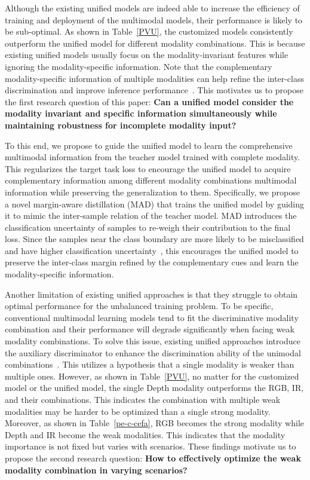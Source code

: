 \documentclass[10pt,twocolumn,letterpaper]{article}
\begin{document}
Although the existing unified models are indeed able to increase the efficiency of training and deployment of the multimodal models, their performance is likely to be sub-optimal. As shown in Table~\ref{PVU}, the customized models consistently outperform the unified model for different modality combinations. This is because existing unified models usually focus on the modality-invariant features while ignoring the modality-specific information. Note that the complementary modality-specific information of multiple modalities can help refine the inter-class discrimination and improve inference performance~\cite{ubm1,ubm2,multimodal-survey}. This motivates us to propose the first research question of this paper: \textbf{Can a unified model consider the modality invariant and specific information simultaneously while maintaining robustness for incomplete modality input? }



To this end, we propose to guide the unified model to learn the comprehensive multimodal information from the teacher model trained with complete modality. This regularizes the target task loss to encourage the unified model to acquire complementary information among different modality combinations multimodal information while preserving the generalization to them. Specifically, we propose a novel margin-aware distillation (MAD) that trains the unified model by guiding it to mimic the inter-sample relation of the teacher model. MAD introduces the classification uncertainty of samples to re-weigh their contribution to the final loss. Since the samples near the class boundary are more likely to be misclassified and have higher classification uncertainty~\cite{margin1}, this encourages the unified model to preserve the inter-class margin refined by the complementary cues and learn the modality-specific information.




Another limitation of existing unified approaches is that they struggle to obtain optimal performance for the unbalanced training problem. To be specific, conventional multimodal learning models tend to fit the discriminative modality combination and their performance will degrade significantly when facing weak modality combinations. To solve this issue, existing unified approaches introduce the auxiliary discriminator to enhance the discrimination ability of the unimodal combinations~\cite{rfnet,mmformer,robust}. This utilizes a hypothesis that a single modality is weaker than multiple ones. However, as shown in Table~\ref{PVU}, no matter for the customized model or the unified model, the single Depth modality outperforms the RGB, IR, and their combinations. This indicates the combination with multiple weak modalities may be harder to be optimized than a single strong modality. Moreover, as shown in Table~\ref{pe-c-cefa}, RGB becomes the strong modality while Depth and IR become the weak modalities. This indicates that the modality importance is not fixed but varies with scenarios. These findings motivate us to propose the second research question: \textbf{How to effectively optimize the weak modality combination in varying scenarios?}
\end{document}

